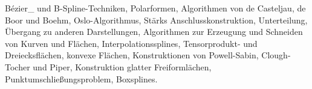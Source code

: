 \begin{module}
\begin{learningoutcomes}
\end{learningoutcomes}

\begin{content}
Bézier\_ und B-Spline-Techniken, Polarformen, Algorithmen von de Casteljau, de Boor und Boehm, Oslo-Algorithmus, Stärks Anschlusskonstruktion, Unterteilung, Übergang zu anderen Darstellungen, Algorithmen zur Erzeugung und Schneiden von Kurven und Flächen, Interpolationssplines, Tensorprodukt- und Dreiecksflächen, konvexe Flächen, Konstruktionen von Powell-Sabin, Clough-Tocher und Piper, Konstruktion glatter Freiformlächen, Punktumschließungsproblem, Boxsplines.


\end{content}



\end{module}

